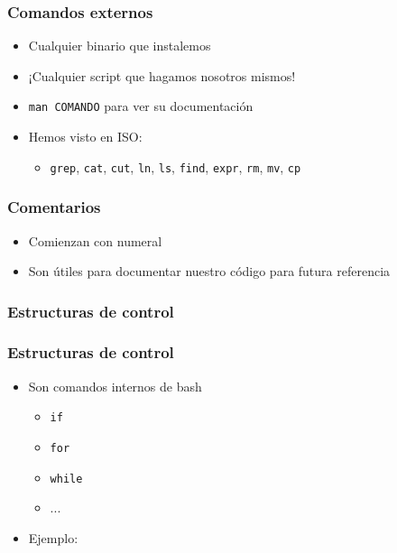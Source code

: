 \begin{frame}
  \frametitle{Comandos externos}
  \begin{itemize}
    \item Cualquier binario que instalemos
    \item ¡Cualquier script que hagamos nosotros mismos!
    \item \texttt{man COMANDO} para ver su documentación
    \item Hemos visto en ISO:
    \begin{itemize}
      \item \texttt{grep}, \texttt{cat}, \texttt{cut}, \texttt{ln}, \texttt{ls},
        \texttt{find}, \texttt{expr}, \texttt{rm}, \texttt{mv}, \texttt{cp}
    \end{itemize}
  \end{itemize}
\end{frame}

\begin{frame}
  \frametitle{Comentarios}
  \begin{itemize}
    \item Comienzan con numeral
    \item Son útiles para documentar nuestro código para futura referencia
  \end{itemize}
\end{frame}

\subsubsection{Estructuras de control}

\begin{frame}
  \frametitle{Estructuras de control}
  \begin{itemize}
    \item Son comandos internos de bash
    \begin{itemize}
      \item \texttt{if}
      \item \texttt{for}
      \item \texttt{while}
      \item ...
    \end{itemize}
    \item Ejemplo:
  \end{itemize}
\end{frame}

